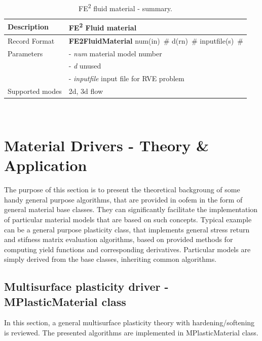 \documentclass[a4paper]{article}
\newcommand{\descitem}[1]{{\noindent \bf #1}}
\newcommand{\elemparam}[2]{{{#1\tiny (#2)}~\#}}
\newcommand{\param}[1]{{\it #1}}
\newenvironment{mmt}{\begin{tabular}{|l|p{9cm}|}}{\end{tabular}\\}
\newenvironment{mmt}{\begin{tabular}{|l|l|}}{\end{tabular}\\}
\begin{document}
\begin{table}[!htb]
\centering
\begin{mmt}
\hline
Description & FE\textsuperscript{2} Fluid material\\
\hline
Record Format  & \descitem{FE2FluidMaterial} \elemparam{num}{in} \elemparam{d}{rn} \elemparam{inputfile}{s}\\
Parameters &- \param{num}       material model number\\
           &- \param{d}         unused\\
           &- \param{inputfile} input file for RVE problem\\
Supported modes&  2d, 3d flow\\
\hline
\end{mmt}
\caption{FE\textsuperscript{2} fluid material - summary.}
\label{FE2FluidMaterial_table}
\end{table}

\clearpage

\section{Material Drivers - Theory \& Application}
The purpose of this section is to present the theoretical backgroung
of some handy general purpose algorithms, that are provided in oofem in the
form of general material base classes. They can significantly
facilitate the implementation of particular material models that are
based on such concepts. Typical example can be a general purpose
plasticity class, that implements general stress return and stifness
matrix evaluation algorithms, based on provided methods for computing
yield functions and corresponding derivatives. Particular
models are simply derived from the base classes, inheriting
common algorithms.



\subsection{Multisurface plasticity driver - MPlasticMaterial class}

In this section, a general multisurface plasticity theory with
hardening/softening is reviewed. The presented algorithms are
implemented in MPlasticMaterial class.
\end{document}
